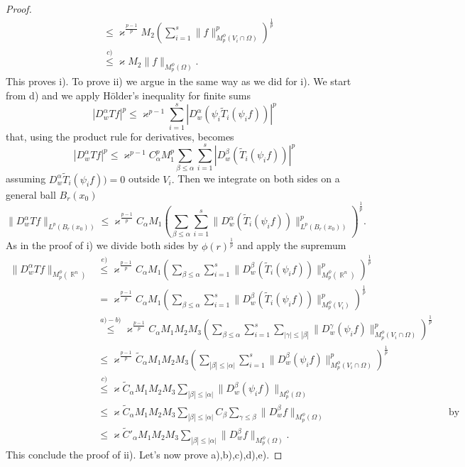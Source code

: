 \documentclass[12pt]{article}
\theoremstyle{definition}
\DeclareMathOperator\rr{\mathbb{R}}
\begin{document}
\begin{proof}
\begin{align*}
							&\le  \varkappa^{\frac{p-1}{p}} M_2\left ( \sum_{i=1}^s \|f\|_{M^\phi_p(V_i\cap\Omega)}^p \right)^{\frac{1}{p}}\\
							&\overset{c)}\le  \varkappa M_2\|f\|_{M^\phi_p(\Omega)}.
\end{align*}
This proves i). To prove ii) we argue in the same way as we did for i). We start from d) and we apply Hölder's inequality for finite sums
\[ |D^\alpha_wTf|^p \le \varkappa^{p-1} \sum_{i=1}^s |D^\alpha_w (\psi_i\widetilde T_i(\psi_if))|^p \]
that, using the product rule for derivatives, becomes
\[ |D^\alpha_wTf|^p \le \varkappa^{p-1}C_\alpha^pM_1^p  \sum_{\beta\le \alpha}\sum_{i=1}^s|D^\beta_w (\widetilde T_i(\psi_if))|^p \]
assuming $D^\alpha_w \widetilde T_i(\psi_if))=0$ outside $V_i.$
Then we integrate on both sides on a general ball $B_r(x_0)$
\[ \| D^\alpha_wTf\|_{L^p(B_r(x_0))} \le \varkappa^{\frac{p-1}{p}}C_\alpha M_1 \left( \sum_{\beta\le \alpha}\sum_{i=1}^s \|D^\alpha_w (\widetilde T_i(\psi_if))\|^p_{L^p(B_r(x_0))} \right)^{\frac{1}{p}}.\]
As in the proof of i) we divide both sides by $\phi(r)^{\frac{1}{p}}$ and apply the supremum
\begin{align*}
\|D^\alpha_w Tf \|_{M_p^\phi(\rr^n)} &\overset{e)} \le  \varkappa^{\frac{p-1}{p}} C_\alpha M_1\left ( \sum_{\beta\le \alpha}\sum_{i=1}^s \|D^\beta_w (\widetilde T_i(\psi_if))\|_{M^\phi_p(\rr^n)}^p \right)^{\frac{1}{p}} \\
										&=\varkappa^{\frac{p-1}{p}} C_\alpha M_1\left ( \sum_{\beta\le \alpha}\sum_{i=1}^s \|D^\beta_w (\widetilde T_i(\psi_if))\|_{M^\phi_p(V_i)}^p \right)^{\frac{1}{p}}\\
										&\overset{a)-b)} \le \varkappa^{\frac{p-1}{p}} C_\alpha M_1M_2M_3\left ( \sum_{\beta\le \alpha}\sum_{i=1}^s \sum_{|\gamma|\le |\beta|}\|D^\gamma_w (\psi_if)\|_{M^\phi_p(V_i\cap \Omega)}^p \right)^{\frac{1}{p}}\\
										&\le \varkappa^{\frac{p-1}{p}} \widetilde C_\alpha M_1M_2M_3\left ( \sum_{|\beta|\le |\alpha|}\sum_{i=1}^s\|D^\beta_w (\psi_if)\|_{M^\phi_p(V_i\cap \Omega)}^p \right)^{\frac{1}{p}}\\
										&\overset{c)}\le \varkappa \widetilde C_\alpha M_1M_2M_3 \sum_{|\beta|\le |\alpha|} \|D^\beta_w (\psi_if)\|_{M^\phi_p(\Omega)} \\
										&\le \varkappa \widetilde C_\alpha M_1M_2M_3 \sum_{|\beta|\le |\alpha|}C_\beta \sum_{\gamma\le \beta} \|D^\beta_w f\|_{M^\phi_p(\Omega)} && \text{by Leibniz rule} \\
										&\le \varkappa \widetilde C'_\alpha M_1M_2M_3 \sum_{|\beta|\le |\alpha|}\|D^\beta_w f\|_{M^\phi_p(\Omega)}.
\end{align*}
This conclude the proof of ii). Let's now prove a),b),c),d),e).


\end{proof}
\end{document}
